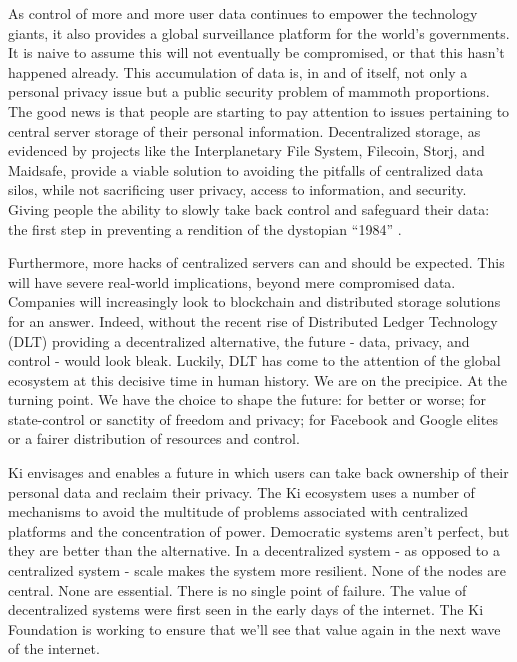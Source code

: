 As control of more and more user data continues to empower the technology giants, it also provides a global surveillance platform for the world's governments. It is naive to assume this will not eventually be compromised, or that this hasn't happened already. This accumulation of data is, in and of itself, not only a personal privacy issue but a public security problem of mammoth proportions. The good news is that people are starting to pay attention to issues pertaining to central server storage of their personal information. Decentralized storage, as evidenced by projects like the Interplanetary File System, Filecoin, Storj, and Maidsafe, provide a viable solution to avoiding the pitfalls of centralized data silos, while not sacrificing user privacy, access to information, and security. Giving people the ability to slowly take back control and safeguard their data: the first step in preventing a rendition of the dystopian ``1984'' \cite{orwell2009nineteen}. 

Furthermore, more hacks of centralized servers can and should be expected. This will have severe real-world implications, beyond mere compromised data. Companies will increasingly look to blockchain and distributed storage solutions for an answer. Indeed, without the recent rise of Distributed Ledger Technology (DLT) providing a decentralized alternative, the future - data, privacy, and control - would look bleak. Luckily, DLT has come to the attention of the global ecosystem at this decisive time in human history. We are on the precipice. At the turning point. We have the choice to shape the future: for better or worse; for state-control or sanctity of freedom and privacy; for Facebook and Google elites or a fairer distribution of resources and control. 

Ki envisages and enables a future in which users can take back ownership of their personal data  and reclaim their privacy. The Ki ecosystem uses a number of  mechanisms to avoid the multitude of problems associated with centralized platforms and the concentration of power. Democratic systems aren't perfect, but they are better than the alternative. In a decentralized system - as opposed to a centralized system - scale makes the system more resilient. None of the nodes are central. None are essential. There is no single point of failure. The value of decentralized systems were first seen in the early days of the internet. The Ki Foundation is working to ensure that we'll see that value again in the next wave of the internet. 


